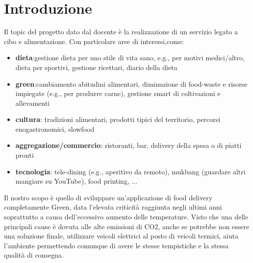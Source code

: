 \documentclass{article}
\begin{document}
\section{Introduzione}\par
Il topic del progetto dato dal docente è la realizzazione di un servizio legato a cibo e alimentazione. Con particolare aree di interessi,come: \par
\begin{itemize}
    \item \textbf{dieta}:gestione dieta per uno stile di vita sano, e.g., per motivi medici/altro, dieta per sportivi, gestione ricettari, diario della dieta \par
    \item \textbf{green}:cambiamento abitudini alimentari, diminuzione di food-waste e risorse impiegate (e.g., per produrre carne), gestione smart di coltivazioni e allevamenti \par
    \item \textbf{cultura}: tradizioni alimentari, prodotti tipici del territorio, percorsi enogastronomici, slowfood\par
    \item \textbf{aggregazione/commercio}: ristoranti, bar, delivery della spesa o di piatti pronti \par
    \item \textbf{tecnologia}: tele-dining (e.g., aperitivo da remoto), mukbang (guardare altri mangiare su YouTube), food printing, ... \par
\end{itemize}
\vspace{1cm}



     \par
    \vspace{0.5cm}
    Il nostro scopo è quello di sviluppare un’applicazione di food delivery completamente Green, data l'elevata criticità raggiunta negli ultimi anni soprattutto a causa dell'eccessivo aumento delle temperature. Visto che una delle principali cause è dovuta alle alte emissioni di CO2, anche se potrebbe non essere una soluzione finale, utilizzare veicoli elettrici al posto di veicoli termici, aiuta l’ambiente permettendo comunque di avere le stesse tempistiche e la stessa qualità di consegna.
    \vspace{1cm}
    
\end{document}
